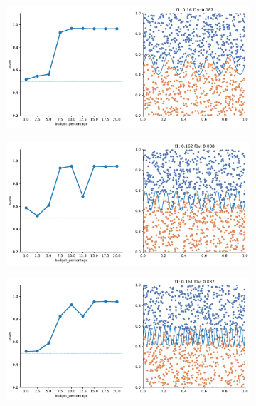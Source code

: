 \begin{figure}
\begin{subfigure}{.5\textwidth}
    \end{subfigure}
    \begin{subfigure}{.5\textwidth}
        \centering
        \includegraphics[width=\textwidth]{img/2d_v2/12.pdf}
    \end{subfigure}%
    \hfill
    \begin{subfigure}{.5\textwidth}
        \centering
        \includegraphics[width=\textwidth]{img/2d_v2/13.pdf}
    \end{subfigure}
    \begin{subfigure}{.5\textwidth}
        \centering
        \includegraphics[width=\textwidth]{img/2d_v2/14.pdf}

\end{subfigure}
\end{figure}
